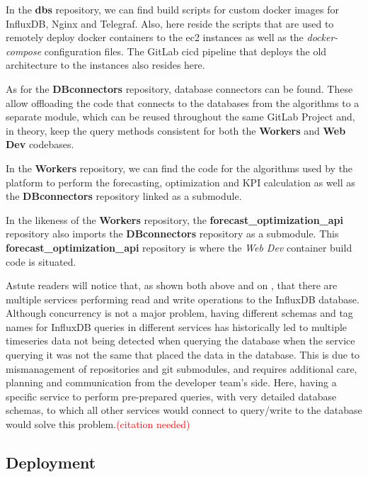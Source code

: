 In the \textbf{dbs} repository, we can find build scripts for custom docker images for InfluxDB, Nginx and Telegraf. Also, here reside the scripts that are used to remotely deploy docker containers to the \gls{ec2} instances as well as the \textit{docker-compose} configuration files. The GitLab \gls{cicd} pipeline that deploys the old architecture to the instances also resides here.

As for the \textbf{DBconnectors} repository, database connectors can be found. These allow offloading the code that connects to the databases from the algorithms to a separate module, which can be reused throughout the same GitLab Project and, in theory, keep the query methods consistent for both the \textbf{Workers} and \textbf{Web Dev} codebases.

In the \textbf{Workers} repository, we can find the code for the algorithms used by the platform to perform the forecasting, optimization and KPI calculation as well as the \textbf{DBconnectors} repository linked as a submodule.

In the likeness of the \textbf{Workers} repository, the \textbf{forecast\_optimization\_api} repository also imports the \textbf{DBconnectors} repository as a submodule. This \textbf{forecast\_optimization\_api} repository is where the \textit{Web Dev} container build code is situated. 

Astute readers will notice that, as shown both above and on , that there are multiple services performing read and write operations to the InfluxDB database. Although concurrency is not a major problem, having different schemas and tag names for InfluxDB queries in different services has historically led to multiple timeseries data not being detected when querying the database when the service querying it was not the same that placed the data in the database. This is due to mismanagement of repositories and git submodules, and requires additional care, planning and communication from the developer team's side. Here, having a specific service to perform pre-prepared queries, with very detailed database schemas, to which all other services would connect to query/write to the database would solve this problem.\textcolor{red}{(citation needed)}


\subsection{Deployment}\label{methodology:ss:deployment}

